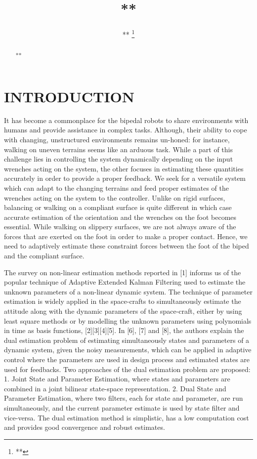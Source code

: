 \documentclass[letterpaper, 10pt, conference]{ieeeconf}      %
\title{\LARGE \bf
**
}
\author{
**%
\thanks{
**}	
	}
\begin{document}
\maketitle
\thispagestyle{empty}
\pagestyle{empty}


\begin{abstract}

**
\end{abstract}




\section{INTRODUCTION}

It has become a commonplace for the  bipedal robots to share environments with humans and provide assistance in complex tasks. Although, their ability to cope with changing, unstructured environments remains un-honed: for instance, walking on uneven terrains seems like an arduous task. While a part of this challenge lies in controlling the system dynamically depending on the input wrenches acting on the system, the other focuses in estimating these quantities accurately in order to provide a proper feedback. We seek for a versatile system which can adapt to the changing terrains and feed proper estimates of the wrenches acting on the system to the controller. Unlike on rigid surfaces, balancing or walking on a compliant surface is quite different in which case accurate estimation of the orientation and the wrenches on the foot becomes essential. While walking on slippery surfaces, we are not always aware of the forces that are exerted on the foot in order to make a proper contact. Hence, we need to adaptively estimate these constraint forces between the foot of the biped and the compliant surface. 

The survey on non-linear estimation methods reported in [1] informs us of the popular technique of Adaptive Extended Kalman Filtering used to estimate the unknown parameters of a non-linear dynamic system. The technique of parameter estimation is widely applied in the space-crafts to simultaneously estimate the attitude along with the dynamic parameters of the space-craft, either by using least square methods or by modelling the unknown parameters using polynomials in time as basis functions, [2][3][4][5]. In [6], [7] and [8], the authors explain the dual estimation problem of estimating simultaneously states and parameters of a dynamic system, given the noisy measurements, which can be applied in adaptive control where the parameters are used in design process and estimated states are used for feedbacks. Two approaches of the dual estimation problem are proposed: 1. Joint State and Parameter Estimation, where states and parameters are combined in a joint bilinear state-space representation. 2. Dual State and Parameter Estimation, where two filters, each for state and parameter, are run simultaneously, and the current parameter estimate is used by state filter and vice-versa. The dual estimation method is simplistic, has a low computation cost and provides good convergence and robust estimates.
\end{document}
